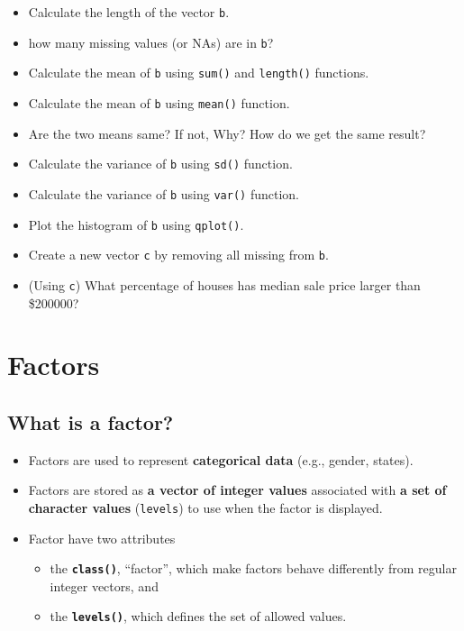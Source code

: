 \documentclass[]{book}
\providecommand{\tightlist}{%
  \setlength{\itemsep}{0pt}\setlength{\parskip}{0pt}}
\begin{document}
\begin{itemize}
\item
  Calculate the length of the vector \texttt{b}.
\item
  how many missing values (or NAs) are in \texttt{b}?
\item
  Calculate the mean of \texttt{b} using \texttt{sum()} and \texttt{length()} functions.
\item
  Calculate the mean of \texttt{b} using \texttt{mean()} function.
\item
  Are the two means same? If not, Why? How do we get the same result?
\item
  Calculate the variance of \texttt{b} using \texttt{sd()} function.
\item
  Calculate the variance of \texttt{b} using \texttt{var()} function.
\item
  Plot the histogram of \texttt{b} using \texttt{qplot()}.
\item
  Create a new vector \texttt{c} by removing all missing from \texttt{b}.
\item
  (Using \texttt{c}) What percentage of houses has median sale price larger than \$200000?
\end{itemize}

\hypertarget{factors}{%
\section{Factors}\label{factors}}

\hypertarget{what-is-a-factor}{%
\subsection{What is a factor?}\label{what-is-a-factor}}

\begin{itemize}
\tightlist
\item
  Factors are used to represent \textbf{categorical data} (e.g., gender, states).
\item
  Factors are stored as \textbf{a vector of integer values} associated with \textbf{a set of character values} (\texttt{levels}) to use when the factor is displayed.
\item
  Factor have two attributes

  \begin{itemize}
  \tightlist
  \item
    the \textbf{\texttt{class()}}, ``factor'', which make factors behave differently from regular integer vectors, and
  \item
    the \textbf{\texttt{levels()}}, which defines the set of allowed values.
  \end{itemize}
\end{itemize}
\end{document}
